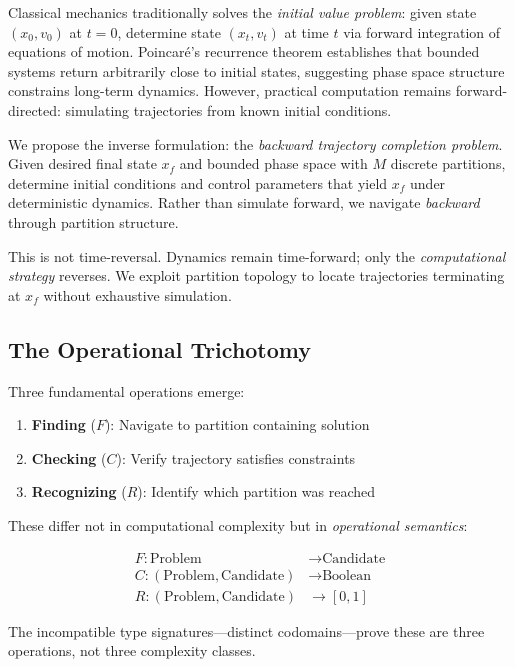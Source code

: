 \documentclass[twocolumn,aps,prl,superscriptaddress,floatfix]{revtex4-2}
\begin{document}
Classical mechanics traditionally solves the \emph{initial value problem}: given state $(x_0, v_0)$ at $t=0$, determine state $(x_t, v_t)$ at time $t$ via forward integration of equations of motion. Poincar\'e's recurrence theorem \cite{Poincare1890} establishes that bounded systems return arbitrarily close to initial states, suggesting phase space structure constrains long-term dynamics. However, practical computation remains forward-directed: simulating trajectories from known initial conditions.

We propose the inverse formulation: the \emph{backward trajectory completion problem}. Given desired final state $x_f$ and bounded phase space with $M$ discrete partitions, determine initial conditions and control parameters that yield $x_f$ under deterministic dynamics. Rather than simulate forward, we navigate \emph{backward} through partition structure.

This is not time-reversal. Dynamics remain time-forward; only the \emph{computational strategy} reverses. We exploit partition topology to locate trajectories terminating at $x_f$ without exhaustive simulation.

\subsection{The Operational Trichotomy}

Three fundamental operations emerge:

\begin{enumerate}
\item \textbf{Finding} ($F$): Navigate to partition containing solution
\item \textbf{Checking} ($C$): Verify trajectory satisfies constraints
\item \textbf{Recognizing} ($R$): Identify which partition was reached
\end{enumerate}

These differ not in computational complexity but in \emph{operational semantics}:

\begin{align}
F: \text{Problem} &\to \text{Candidate} \label{eq:finding}\\
C: (\text{Problem}, \text{Candidate}) &\to \text{Boolean} \label{eq:checking}\\
R: (\text{Problem}, \text{Candidate}) &\to [0,1] \label{eq:recognizing}
\end{align}

The incompatible type signatures—distinct codomains—prove these are three operations, not three complexity classes.
\end{document}
